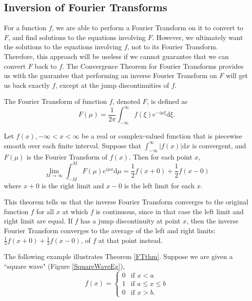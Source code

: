 \subsection{Inversion of Fourier Transforms}
For a function $f$, we are able to perform a Fourier Transform on it to convert to $F$, and find solutions to the equations involving $F$.
However, we ultimately want the solutions to the equations involving $f$, not to its Fourier Transform.
Therefore, this approach will be useless if we cannot guarantee that we can convert $F$ back to $f$.
The Convergence Theorem for Fourier Transforms provides us with the guarantee that performing an inverse Fourier Transform on $F$ will get us back exactly $f$, except at the jump discontinuities of $f$.

\begin{defn} \label{FTdefn}
The Fourier Transform of function $f$, denoted $F$, is defined as
$$F(\mu) = \frac{1}{2\pi}\int_{-\infty}^{\infty}f(\xi)e^{-i\mu\xi}\mathrm{d}\xi.$$
\end{defn}

\begin{thm} \label{FTthm}
Let $f(x), -\infty < x < \infty$ be a real or complex-valued function that is piecewise smooth over each finite interval. \pause Suppose that $\int_{-\infty}^{\infty}|f(x)|\mathrm{d}x$ is convergent, and $F(\mu)$ is the Fourier Transform of $f(x)$. \pause Then for each point $x$,
$$\lim_{M\rightarrow\infty}\int_{-M}^{M} F(\mu)e^{i\mu x}\mathrm{d}\mu = \frac{1}{2}f(x+0) + \frac{1}{2}f(x-0)$$
where $x+0$ is the right limit and $x-0$ is the left limit for each $x$.
\end{thm}

This theorem tells us that the inverse Fourier Transform converges to the original function $f$ for all $x$ at which $f$ is continuous, since in that case the left limit and right limit are equal. If $f$ has a jump discontinuity at point $x$, then the inverse Fourier Transform converges to the average of the left and right limits: $\frac{1}{2}f(x+0) + \frac{1}{2}f(x-0)$, of $f$ at that point instead.

The following example illustrates Theorem \ref{FTthm}. Suppose we are given a ``square wave" (Figure \ref{SquareWaveEg}),
$$f(x) = \begin{cases}
      \displaystyle 0 & \mbox{if }x < a \\
      1 & \mbox{if }a \leq x \leq b \\
      0 & \mbox{if }x > b.
   \end{cases}$$

